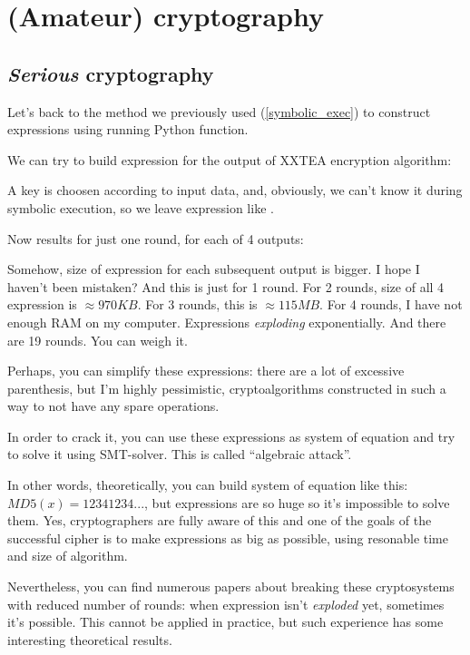 \section{(Amateur) cryptography}
\label{crypto}

\subsection{\textit{Serious} cryptography}

Let's back to the method we previously used (\ref{symbolic_exec}) to construct expressions using running Python function.

We can try to build expression for the output of XXTEA encryption algorithm:



A key is choosen according to input data, and, obviously, we can't know it during symbolic execution, so we leave expression like .

Now results for just one round, for each of 4 outputs:



Somehow, size of expression for each subsequent output is bigger. I hope I haven't been mistaken?
And this is just for 1 round.
For 2 rounds, size of all 4 expression is $\approx 970KB$.
For 3 rounds, this is $\approx 115MB$.
For 4 rounds, I have not enough RAM on my computer.
Expressions \textit{exploding} exponentially.
And there are 19 rounds.
You can weigh it.

Perhaps, you can simplify these expressions: there are a lot of excessive parenthesis,
but I'm highly pessimistic, cryptoalgorithms constructed in such a way to not have any spare operations.

In order to crack it, you can use these expressions as system of equation and try to solve it using SMT-solver.
This is called ``algebraic attack''.

In other words, theoretically, you can build system of equation like this: $MD5(x)=12341234...$,
but expressions are so huge so it's impossible to solve them.
Yes, cryptographers are fully aware of this and one of the goals of the successful cipher is
to make expressions as big as possible, using resonable time and size of algorithm.

Nevertheless, you can find numerous papers about breaking these cryptosystems with reduced number of rounds:
when expression isn't \textit{exploded} yet, sometimes it's possible.
This cannot be applied in practice, but such experience has some interesting theoretical results.

